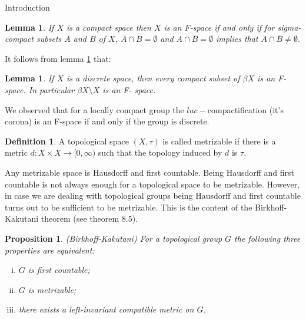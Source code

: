 \documentclass[12pt,a4paper]{amsart}
\theoremstyle{plain}
\newtheorem{lemma}[theorem]{Lemma}
\newtheorem{prop}[theorem]{Proposition}
\theoremstyle{definition}
\newtheorem{definition}[theorem]{Definition}
\begin{document}
\begin{section}{Introduction}
\begin{lemma}\label{F-space}
If $X$ is a compact space then $X$ is an F-space if and only if for sigma-compact subsets $A$ and $B$ of $X$, $\bar{A}\cap B=\emptyset$ and $A\cap\bar{B}=\emptyset$ implies that $\bar{A}\cap\bar{B}\neq\emptyset.$
\end{lemma}

It follows from lemma \ref{F-space} that:
\begin{lemma}
If $X$ is a discrete space, then every compact subset of $\beta X$ is an F- space. In particular $\beta X\setminus X$ is an F- space.
\end{lemma}
We observed that for a locally compact group the $luc-$compactification (it's corona) is an F-space if and only if the group is discrete. 


\begin{definition}
A topological space $(X,\tau)$ is called metrizable if there is a metric $d:X\times X\to [0,\infty)$ such that the topology induced by $d$ is $\tau$.
\end{definition}
Any metrizable space is Hausdorff and first countable. Being Hausdorff and first countable is not always enough for a topological space to be metrizable. However, in case we are dealing with topological groups being Hausdorff and first countable turns out to be sufficient to be metrizable. This is the content of the Birkhoff-Kakutani theorem (see \cite{MR551496} theorem 8.5).
\begin{prop}
(Birkhoff-Kakutani) For a topological group $G$ the following three properties are equivalent:
\begin{enumerate}[(i)]
\item $G$ is first countable;\\
\item $G$ is metrizable;\\
\item there exists a left-invariant compatible metric on $G$.
\end{enumerate}
\end{prop}

\end{section}
\end{document}
